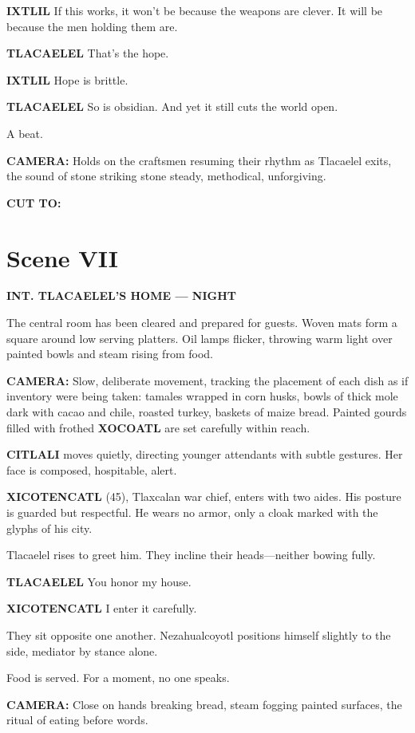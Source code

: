 \documentclass[12pt]{article}
\begin{document}
\textbf{IXTLIL}  
If this works, it won’t be because the weapons are clever.  
It will be because the men holding them are.

\textbf{TLACAELEL}  
That’s the hope.

\textbf{IXTLIL}  
Hope is brittle.

\textbf{TLACAELEL}  
So is obsidian.  
And yet it still cuts the world open.

A beat.

\textbf{CAMERA:} Holds on the craftsmen resuming their rhythm as Tlacaelel exits, the sound of stone striking stone steady, methodical, unforgiving.

\textbf{CUT TO:}

\section*{Scene VII}

\textbf{INT. TLACAELEL’S HOME — NIGHT}

The central room has been cleared and prepared for guests. Woven mats form a square around low serving platters. Oil lamps flicker, throwing warm light over painted bowls and steam rising from food.

\textbf{CAMERA:} Slow, deliberate movement, tracking the placement of each dish as if inventory were being taken: tamales wrapped in corn husks, bowls of thick mole dark with cacao and chile, roasted turkey, baskets of maize bread. Painted gourds filled with frothed \textbf{XOCOATL} are set carefully within reach.

\textbf{CITLALI} moves quietly, directing younger attendants with subtle gestures. Her face is composed, hospitable, alert.

\textbf{XICOTENCATL} (45), Tlaxcalan war chief, enters with two aides. His posture is guarded but respectful. He wears no armor, only a cloak marked with the glyphs of his city.

Tlacaelel rises to greet him. They incline their heads—neither bowing fully.

\textbf{TLACAELEL}  
You honor my house.

\textbf{XICOTENCATL}  
I enter it carefully.

They sit opposite one another. Nezahualcoyotl positions himself slightly to the side, mediator by stance alone.

Food is served. For a moment, no one speaks.

\textbf{CAMERA:} Close on hands breaking bread, steam fogging painted surfaces, the ritual of eating before words.
\end{document}
